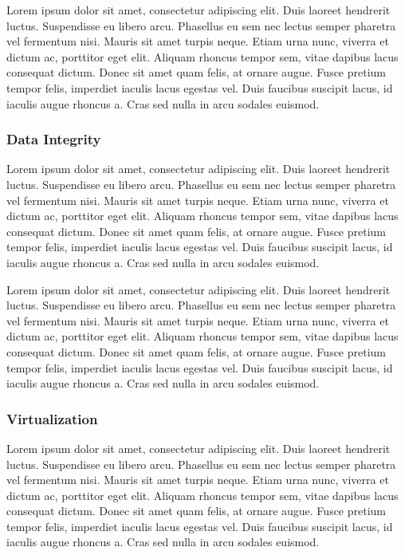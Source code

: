 \documentclass[final,conference,10pt]{IEEEtran}
\begin{document}
Lorem ipsum dolor sit amet, consectetur adipiscing elit. Duis laoreet hendrerit luctus. Suspendisse eu libero arcu. Phasellus eu sem nec lectus semper pharetra vel fermentum nisi. Mauris sit amet turpis neque. Etiam urna nunc, viverra et dictum ac, porttitor eget elit. Aliquam rhoncus tempor sem, vitae dapibus lacus consequat dictum. Donec sit amet quam felis, at ornare augue. Fusce pretium tempor felis, imperdiet iaculis lacus egestas vel. Duis faucibus suscipit lacus, id iaculis augue rhoncus a. Cras sed nulla in arcu sodales euismod.

\subsubsection{Data Integrity}
Lorem ipsum dolor sit amet, consectetur adipiscing elit. Duis laoreet hendrerit luctus. Suspendisse eu libero arcu. Phasellus eu sem nec lectus semper pharetra vel fermentum nisi. Mauris sit amet turpis neque. Etiam urna nunc, viverra et dictum ac, porttitor eget elit. Aliquam rhoncus tempor sem, vitae dapibus lacus consequat dictum. Donec sit amet quam felis, at ornare augue. Fusce pretium tempor felis, imperdiet iaculis lacus egestas vel. Duis faucibus suscipit lacus, id iaculis augue rhoncus a. Cras sed nulla in arcu sodales euismod.

Lorem ipsum dolor sit amet, consectetur adipiscing elit. Duis laoreet hendrerit luctus. Suspendisse eu libero arcu. Phasellus eu sem nec lectus semper pharetra vel fermentum nisi. Mauris sit amet turpis neque. Etiam urna nunc, viverra et dictum ac, porttitor eget elit. Aliquam rhoncus tempor sem, vitae dapibus lacus consequat dictum. Donec sit amet quam felis, at ornare augue. Fusce pretium tempor felis, imperdiet iaculis lacus egestas vel. Duis faucibus suscipit lacus, id iaculis augue rhoncus a. Cras sed nulla in arcu sodales euismod.

\subsubsection{Virtualization}
Lorem ipsum dolor sit amet, consectetur adipiscing elit. Duis laoreet hendrerit luctus. Suspendisse eu libero arcu. Phasellus eu sem nec lectus semper pharetra vel fermentum nisi. Mauris sit amet turpis neque. Etiam urna nunc, viverra et dictum ac, porttitor eget elit. Aliquam rhoncus tempor sem, vitae dapibus lacus consequat dictum. Donec sit amet quam felis, at ornare augue. Fusce pretium tempor felis, imperdiet iaculis lacus egestas vel. Duis faucibus suscipit lacus, id iaculis augue rhoncus a. Cras sed nulla in arcu sodales euismod.
\end{document}
